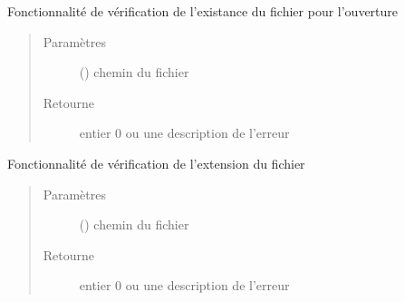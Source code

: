 \documentclass[letterpaper,10pt,openany,oneside,french]{sphinxmanual}
\begin{document}
\begin{fulllineitems}
\label{\detokenize{verificationFormatFichier:chargement_des_donnees.verificationFormatFichier.verifExistence}}
Fonctionnalité de vérification de l’existance du fichier pour l’ouverture
\begin{quote}\begin{description}
\item[{Paramètres}] \leavevmode
{} () \textendash{} chemin du fichier

\item[{Retourne}] \leavevmode
entier 0 ou une description de l’erreur

\end{description}\end{quote}

\end{fulllineitems}


\begin{fulllineitems}
\label{\detokenize{verificationFormatFichier:chargement_des_donnees.verificationFormatFichier.verifExtension}}
Fonctionnalité de vérification de l’extension du fichier
\begin{quote}\begin{description}
\item[{Paramètres}] \leavevmode
{} () \textendash{} chemin du fichier

\item[{Retourne}] \leavevmode
entier 0 ou une description de l’erreur

\end{description}\end{quote}

\end{fulllineitems}

\end{document}
